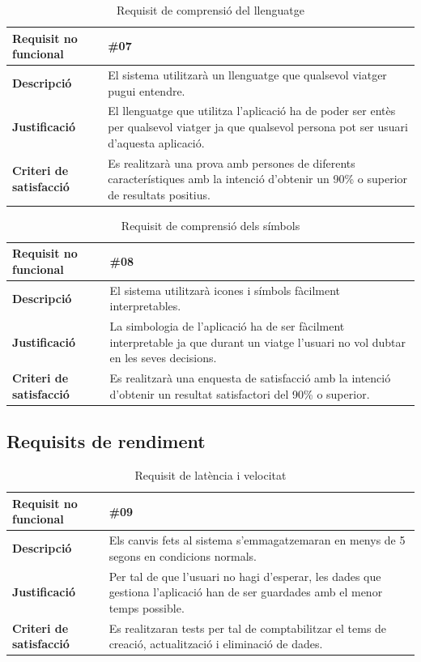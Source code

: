\begin{itemize}
\begin{table}[!h]
\centering
\begin{tabular}{|l|M|}
\hline
\textbf{Requisit no funcional }& \#07    \\ \hline
\textbf{Descripció} &  El sistema utilitzarà un llenguatge que qualsevol viatger pugui entendre. \\ \hline
\textbf{Justificació} & El llenguatge que utilitza l’aplicació ha de poder ser
entès per qualsevol viatger ja que qualsevol persona
pot ser usuari d’aquesta aplicació. \\ \hline
\textbf{Criteri de satisfacció} & Es realitzarà una prova amb persones de diferents característiques amb la intenció d’obtenir un 90\% o superior de resultats positius.
\\ \hline
\end{tabular}
\label{}
\caption{Requisit de comprensió del llenguatge}
\end{table}

\begin{table}[!h]
\centering
\begin{tabular}{|l|M|}
\hline
\textbf{Requisit no funcional }& \#08    \\ \hline
\textbf{Descripció} &  El sistema utilitzarà icones i símbols fàcilment interpretables. \\ \hline
\textbf{Justificació} & La simbologia de l’aplicació ha de ser fàcilment interpretable ja que durant un viatge l’usuari no vol dubtar en les seves decisions.   \\ \hline
\textbf{Criteri de satisfacció} & Es realitzarà una enquesta de satisfacció amb la intenció d’obtenir un resultat satisfactori del 90\% o superior.   \\ \hline
\end{tabular}
\label{}
\caption{Requisit de comprensió dels símbols}
\end{table}

\end{itemize}

\subsection{Requisits de rendiment}

\begin{table}[!h]
\centering
\begin{tabular}{|l|M|}
\hline
\textbf{Requisit no funcional }& \#09   \\ \hline
\textbf{Descripció} &  Els canvis fets al sistema s’emmagatzemaran en
menys de 5 segons en condicions normals.
 \\ \hline
\textbf{Justificació} & Per tal de que l’usuari no hagi d’esperar, les dades
que gestiona l’aplicació han de ser guardades amb el menor temps possible.
  \\ \hline
\textbf{Criteri de satisfacció} & Es realitzaran tests per tal de comptabilitzar el tems de creació, actualització i eliminació de dades.  \\ \hline
\end{tabular}
\label{}
\caption{Requisit de latència i velocitat}
\end{table}

